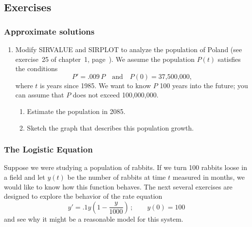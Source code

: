 \subsection{Exercises}
\label{subsec:exercises}

\subsubsection{Approximate solutions}
\label{subsubsec:approximate-solutions}




\begin{enumerate}
\item Modify SIRVALUE and SIRPLOT to analyze the population of
Poland (see exercise~25 of chapter~1, page~\pageref{Poland}).  We assume the 
population $P(t)$ satisfies the conditions 
	\[
P' = .009 \, P \quad \mbox{and} \quad 
		P(0) = \mbox{37,500,000},
\]
where $t$ is years since 1985.  We want to know $P$ 100 
years into the future; you can assume that $P$ does not 
exceed 100,000,000.

  \begin{enumerate}
  \item Estimate the population in 2085.

  \item Sketch the graph that describes this population growth.


\end{enumerate}
\end{enumerate}
\subsubsection{The Logistic Equation}
\label{subsubsec:the-logistic-equation}

Suppose we were studying a population of rabbits.  If we turn 100
 rabbits loose in a field and let $y(t)$ be the number of rabbits at
 time $t$ measured in months, we would like to know how this function
 behaves. The next several exercises are designed to explore the
 behavior of the rate equation
\[
y' = {\displaystyle .1y \left( 1-\frac{y}{1000} \right)} \, ; 
    \qquad y(0) = 100
\]
and see why it might be a reasonable model for this system.


